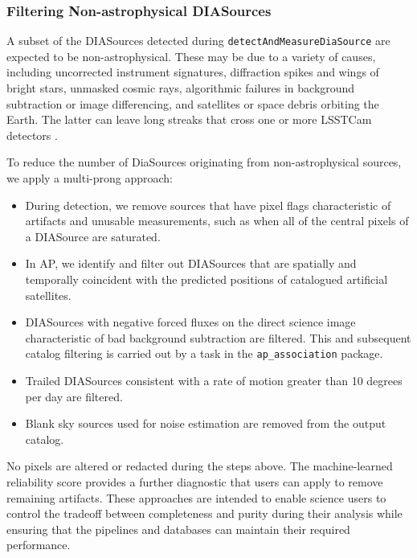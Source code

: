 \subsubsection{Filtering Non-astrophysical DIASources}
\label{sec:streaks}

A subset of the DIASources detected during \texttt{detectAndMeasureDiaSource} are expected to be non-astrophysical.
These may be due to a variety of causes, including uncorrected instrument signatures, diffraction spikes and wings of bright stars, unmasked cosmic rays, algorithmic failures in background subtraction or image differencing, and satellites or space debris orbiting the Earth.
The latter can leave long streaks that cross one or more LSSTCam detectors
\citep{2020AJ....160..226T,2022A&C....3900584H}.

To reduce the number of DiaSources originating from non-astrophysical sources, we apply a multi-prong approach:

\begin{itemize}
\item During detection, we remove sources that have pixel flags characteristic of artifacts and unusable measurements, such as when all of the central pixels of a DIASource are saturated.

\item In AP, we identify and filter out DIASources that are spatially and temporally coincident with the predicted positions of catalogued artificial satellites.

\item DIASources with negative forced fluxes on the direct science image characteristic of bad background subtraction are filtered.
      This and subsequent catalog filtering is carried out by a task in the \texttt{ap\_association} package.

\item Trailed DIASources consistent with a rate of motion greater than 10 degrees per day are filtered.

\item Blank sky sources used for noise estimation are removed from the output catalog.

\end{itemize}

No pixels are altered or redacted during the steps above.
The machine-learned reliability score  provides a further diagnostic that users can apply to remove remaining artifacts.
These approaches are intended to enable science users to control the tradeoff between completeness and purity during their analysis while ensuring that the pipelines and databases can maintain their required performance.

